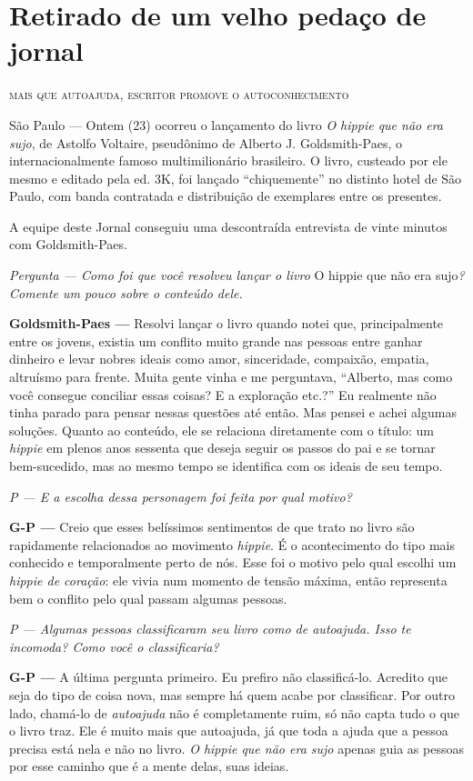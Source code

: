 \chapter{Retirado de um velho pedaço de jornal}

{\Large \textsc{mais que autoajuda, escritor promove o autoconhecimento}}

São Paulo --- Ontem (23) ocorreu o lançamento do livro \emph{O hippie que não era sujo}, de Astolfo Voltaire, pseudônimo de Alberto J. Goldsmith-Paes, o internacionalmente famoso multimilionário brasileiro. O livro, custeado por ele mesmo e editado pela ed. 3K, foi lançado ``chiquemente'' no distinto hotel de São Paulo, com banda contratada e distribuição de exemplares entre os presentes.

A equipe deste Jornal conseguiu uma descontraída entrevista de vinte minutos com Goldsmith-Paes.

\emph{Pergunta --- Como foi que você resolveu lançar o livro} O hippie que não era sujo\emph{? Comente um pouco sobre o conteúdo dele.}

\textbf{Goldsmith-Paes ---} Resolvi lançar o livro quando notei que, principalmente entre os jovens, existia um conflito muito grande nas pessoas entre ganhar dinheiro e levar nobres ideais como amor, sinceridade, compaixão, empatia, altruísmo para frente. Muita gente vinha e me perguntava, ``Alberto, mas como você consegue conciliar essas coisas? E a exploração etc.?'' Eu realmente não tinha parado para pensar nessas questões até então. Mas pensei e achei algumas soluções. Quanto ao conteúdo, ele se relaciona diretamente com o título: um \emph{hippie} em plenos anos sessenta que deseja seguir os passos do pai e se tornar bem-sucedido, mas ao mesmo tempo se identifica com os ideais de seu tempo.

\emph{P --- E a escolha dessa personagem foi feita por qual motivo?}

\textbf{G-P ---} Creio que esses belíssimos sentimentos de que trato no livro são rapidamente relacionados ao movimento \emph{hippie}. É o acontecimento do tipo mais conhecido e temporalmente perto de nós. Esse foi o motivo pelo qual escolhi um \emph{hippie de coração}: ele vivia num momento de tensão máxima, então representa bem o conflito pelo qual passam algumas pessoas.

\emph{P --- Algumas pessoas classificaram seu livro como de \emph{autoajuda}. Isso te incomoda? Como você o classificaria?}

\textbf{G-P ---} A última pergunta primeiro. Eu prefiro não clas\-si\-ficá-lo. Acredito que seja do tipo de coisa nova, mas sempre há quem acabe por classificar. Por outro lado, chamá-lo de \emph{autoajuda} não é completamente ruim, só não capta tudo o que o livro traz. Ele é muito mais que autoajuda, já que toda a ajuda que a pessoa precisa está nela e não no livro. \emph{O hippie que não era sujo} apenas guia as pessoas por esse caminho que é a mente delas, suas ideias.

